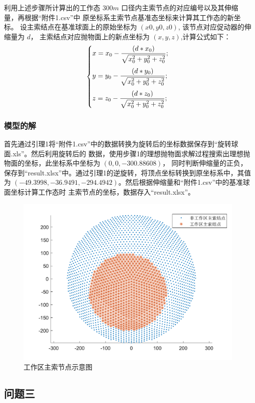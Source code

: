 \documentclass[withoutpreface,bwprint]{cumcmthesis} %
\begin{document}
利用上述步骤所计算出的工作态 $300m$ 口径内主索节点的对应编号以及其伸缩量，再根据“附件1.csv”中
原坐标系主索节点基准态坐标来计算其工作态的新坐标。
设主索结点在基准球面上的原始坐标为 $(x0, y0, z0)$, 该节点对应促动器的伸缩量为 $d$，
主索结点对应抛物面上的新点坐标为 $(x, y,z)$,计算公式如下：
\[
    \begin{dcases}
        \smallskip
        x = x_0 - \frac{(d*x_0)}{\sqrt{x_0^2+y_0^2+z_0^2}}; \\
        \smallskip
        y = y_0 - \frac{(d*y_0)}{\sqrt{x_0^2+y_0^2+z_0^2}}; \\
        z = z_0 - \frac{(d*z_0)}{\sqrt{x_0^2+y_0^2+z_0^2}};
    \end{dcases}
\]
\subsubsection{模型的解}
首先通过引理1将“附件1.csv”中的数据转换为旋转后的坐标数据保存到“旋转球面.xls”。然后利用旋转后的
数据，使用步骤1的理想抛物面求解过程搜索出理想抛物面的坐标，此坐标系中坐标为 $(0,0,-300.88608)$，
同时判断伸缩量的正负，保存到“result.xlsx”中。通过引理1的逆旋转，将顶点坐标转换到原坐标系中，其值
为 $(-49.3998,-36.9491,-294.4942)$。然后根据伸缩量和“附件1.csv”中的基准球面坐标计算工作态时
主索节点的坐标，数据存入“result.xlsx”。
\begin{figure}[!h]
    \centering
    \includegraphics[scale=0.8]{A2.pdf}
    \caption{工作区主索节点示意图}
\end{figure}
\subsection{问题三}
\end{document}
